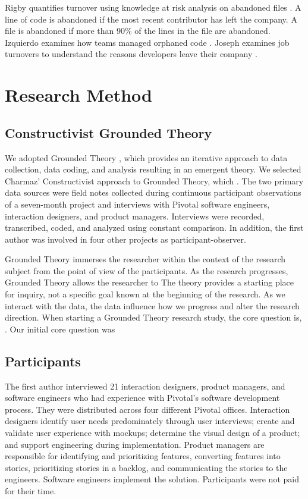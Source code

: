 Rigby quantifies turnover using knowledge at risk analysis on abandoned files  \cite{Rigby2016Turnover}. A line of code is abandoned if the most recent contributor has left the company.  A file is abandoned if more than 90\% of the lines in the file are abandoned.  Izquierdo examines how teams managed orphaned code \cite{Izquierdo2009Turnover}. Joseph examines job turnovers to understand the reasons developers leave their company  \cite{Joseph2007Turnover}.  
\section{Research Method}
\label{ResearchMethod}
\subsection{Constructivist Grounded Theory}

We adopted Grounded Theory \cite{Charmaz}, which provides an iterative approach to data collection, data coding, and analysis resulting in an emergent theory. We selected Charmaz' Constructivist approach to Grounded Theory, which  \cite{StolGroundedTheory}. The two primary data sources were field notes collected during continuous participant observations of a seven-month project and interviews with Pivotal software engineers, interaction designers, and product managers. Interviews were recorded, transcribed, coded, and analyzed using constant comparison. In addition, the first author was involved in four other projects as participant-observer.

Grounded Theory immerses the researcher within the context of the research subject from the point of view of the participants. As the research progresses, Grounded Theory allows the researcher to  The theory provides a starting place for inquiry, not a specific goal known at the beginning of the research. As we interact with the data, the data influence how we progress and alter the research direction. When starting a Grounded Theory research study, the core question is,  \cite{GlaserTheoreticalSensitivity}. Our initial core question was 
\subsection{Participants}
The first author interviewed 21 interaction designers, product managers, and software engineers who had experience with Pivotal's software development process. They were distributed across four different Pivotal offices. Interaction designers identify user needs predominately through user interviews; create and validate user experience with mockups; determine the visual design of a product; and support engineering during implementation. Product managers are responsible for identifying and prioritizing features, converting features into stories, prioritizing stories in a backlog, and communicating the stories to the engineers. Software engineers implement the solution. Participants were not paid for their time. 
